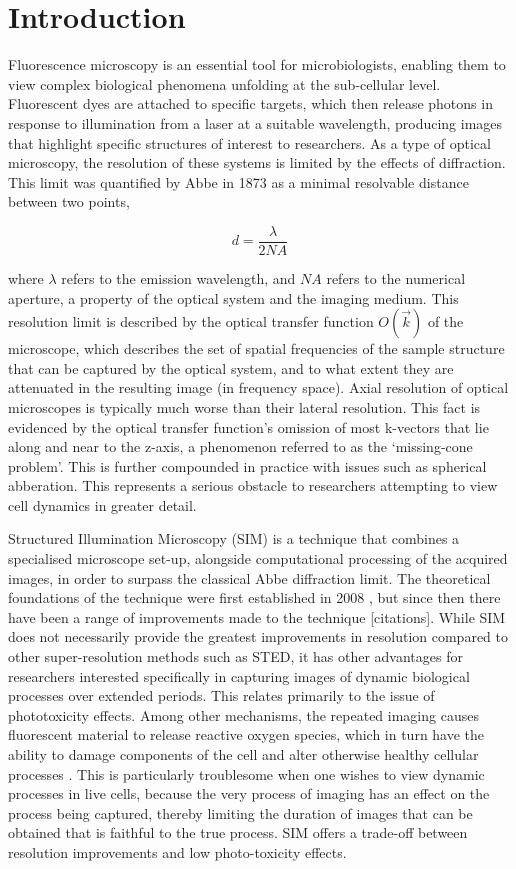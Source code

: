 \documentclass[12pt]{article}
\newcommand\NA{\mathit{NA}}
\begin{document}
\newpage
\tableofcontents

\newpage
{}
\section{Introduction}

Fluorescence microscopy is an essential tool for microbiologists,
enabling them to view complex biological phenomena unfolding at the sub-cellular level.
Fluorescent dyes are attached to specific targets,
which then release photons in response to illumination from a laser at a suitable wavelength,
producing images that highlight specific structures of interest to researchers.
As a type of optical microscopy, the resolution of these systems is limited by the effects of diffraction.
This limit was quantified by Abbe \cite{abbe} in 1873 as a minimal resolvable distance between two points,

\[d=\frac{\lambda}{2\NA}\]

where $\lambda$ refers to the emission wavelength, and $\NA$ refers to the numerical aperture,
a property of the optical system and the imaging medium.
This resolution limit is described by the optical transfer function $O(\vec{k})$ of the microscope,
which describes the set of spatial frequencies of the sample structure that can be captured by the optical system,
and to what extent they are attenuated in the resulting image (in frequency space).
Axial resolution of optical microscopes is typically much worse than their lateral resolution.
This fact is evidenced by the optical transfer function's omission of most k-vectors that lie along and near to the z-axis,
a phenomenon referred to as the `missing-cone problem'.
This is further compounded in practice with issues such as spherical abberation.
This represents a serious obstacle to researchers attempting to view cell dynamics in greater detail.

Structured Illumination Microscopy (SIM) is a technique that combines a specialised microscope set-up,
alongside computational processing of the acquired images,
in order to surpass the classical Abbe diffraction limit.
The theoretical foundations of the technique were first established in 2008 \cite{originalSIM},
but since then there have been a range of improvements made to the technique [citations].
While SIM does not necessarily provide the greatest improvements in resolution compared to other super-resolution methods such as STED,
it has other advantages for researchers interested specifically in capturing images of dynamic biological processes over extended periods.
This relates primarily to the issue of phototoxicity effects.
Among other mechanisms, the repeated imaging causes fluorescent material to release reactive oxygen species,
which in turn have the ability to damage components of the cell and alter otherwise healthy cellular processes \cite{phototoxicity}.
This is particularly troublesome when one wishes to view dynamic processes in live cells,
because the very process of imaging has an effect on the process being captured,
thereby limiting the duration of images that can be obtained that is faithful to the true process.
SIM offers a trade-off between resolution improvements and low photo-toxicity effects.
\end{document}
